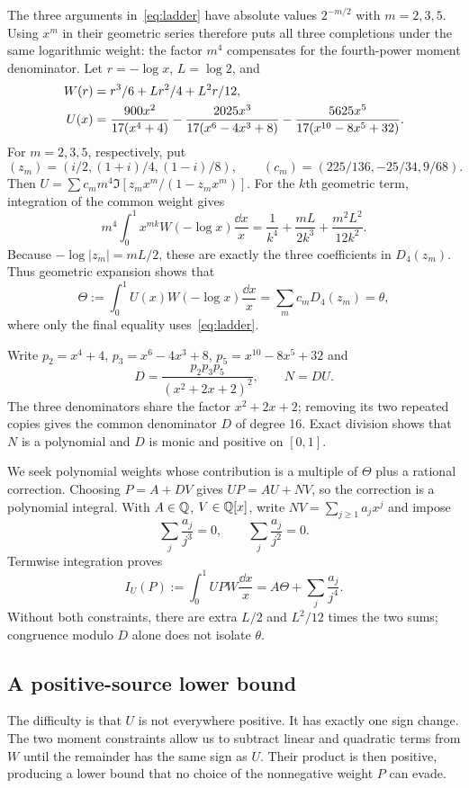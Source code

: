 The three arguments in~\eqref{eq:ladder} have absolute values
$2^{-m/2}$ with $m=2,3,5$. Using $x^m$ in their geometric series
therefore puts all three completions under the same logarithmic
weight: the factor $m^4$ compensates for the fourth-power moment
denominator. Let $r=-\log x$, $L=\log2$, and
\begin{align}
 W(r)&=r^3/6+Lr^2/4+L^2r/12,\notag\\
 U(x)&=\frac{900x^2}{17(x^4+4)}
       -\frac{2025x^3}{17(x^6-4x^3+8)}
       -\frac{5625x^5}{17(x^{10}-8x^5+32)}.\label{eq:U}
\end{align}
For $m=2,3,5$, respectively, put
\[
 (z_m)=(i/2,(1+i)/4,(1-i)/8),\qquad
 (c_m)=(225/136,-25/34,9/68).
\]
Then $U=\sum c_m m^4\Im[z_mx^m/(1-z_mx^m)]$. For the $k$th
geometric term, integration of the common weight gives
\[
 m^4\int_0^1 x^{mk}W(-\log x)\frac{\dd x}{x}
 =\frac1{k^4}+\frac{mL}{2k^3}+\frac{m^2L^2}{12k^2}.
\]
Because $-\log|z_m|=mL/2$, these are exactly the three coefficients
in $D_4(z_m)$. Thus geometric expansion shows that
\begin{equation}\label{eq:Theta}
 \Theta:=\int_0^1 U(x)W(-\log x)\frac{\dd x}{x}
       =\sum_m c_mD_4(z_m)=\theta,
\end{equation}
where only the final equality uses~\eqref{eq:ladder}.

Write $p_2=x^4+4$, $p_3=x^6-4x^3+8$, $p_5=x^{10}-8x^5+32$ and
\[
 D=\frac{p_2p_3p_5}{(x^2+2x+2)^2},\qquad N=DU.
\]
The three denominators share the factor $x^2+2x+2$; removing its
two repeated copies gives the common denominator $D$ of degree 16.
Exact division shows that $N$ is a polynomial and $D$ is monic and
positive on $[0,1]$.

We seek polynomial weights whose contribution is a multiple of
$\Theta$ plus a rational correction. Choosing $P=A+DV$ gives
$UP=AU+NV$, so the correction is a polynomial integral. With
$A\in\mathbb Q$, $V\in\mathbb Q[x]$, write
$NV=\sum_{j\geq1}a_jx^j$ and impose
\begin{equation}\label{eq:constraints}
 \sum_j\frac{a_j}{j^3}=0,\qquad \sum_j\frac{a_j}{j^2}=0.
\end{equation}
Termwise integration proves
\begin{equation}\label{eq:mellin-pair}
 I_U(P):=\int_0^1UPW\frac{\dd x}{x}
       =A\Theta+\sum_j\frac{a_j}{j^4}.
\end{equation}
Without both constraints, there are extra $L/2$ and $L^2/12$ times
the two sums; congruence modulo $D$ alone does not isolate $\theta$.

\subsection{A positive-source lower bound}
The difficulty is that $U$ is not everywhere positive. It has exactly
one sign change. The two moment constraints allow us to subtract
linear and quadratic terms from $W$ until the remainder has the same
sign as $U$. Their product is then positive, producing a lower bound
that no choice of the nonnegative weight $P$ can evade.

